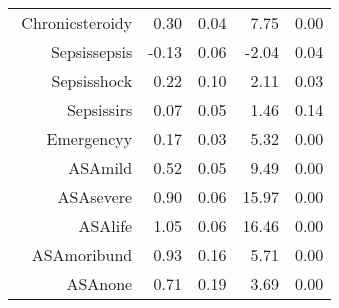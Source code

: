 \begin{tabular}{rrrrr}
$$  Chronic\-steroid\-y & 0.30 & 0.04 & 7.75 & 0.00 \\ 
  Sepsis\-sepsis & -0.13 & 0.06 & -2.04 & 0.04 \\ 
  Sepsis\-shock & 0.22 & 0.10 & 2.11 & 0.03 \\ 
  Sepsis\-sirs & 0.07 & 0.05 & 1.46 & 0.14 \\ 
  Emergency\-y & 0.17 & 0.03 & 5.32 & 0.00 \\ 
  ASA\-mild & 0.52 & 0.05 & 9.49 & 0.00 \\ 
  ASA\-severe & 0.90 & 0.06 & 15.97 & 0.00 \\ 
  ASA\-life & 1.05 & 0.06 & 16.46 & 0.00 \\ 
  ASA\-moribund & 0.93 & 0.16 & 5.71 & 0.00 \\ 
  ASA\-none & 0.71 & 0.19 & 3.69 & 0.00 \\ 
   \hline
\end{tabular}

